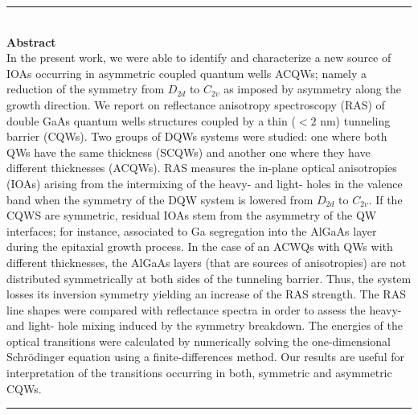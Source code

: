 \cleardoublepage
\vspace{-5cm}
\begin{vcentrepage}
	\noindent\rule[2pt]{\textwidth}{0.8pt}\\

	{\Large\textbf{Abstract}}\\

	
	In the present work, we were able to identify and characterize a new source of IOAs occurring in asymmetric coupled quantum wells ACQWs; namely a reduction of the symmetry from $D_{2d}$ to $C_{2v}$ as imposed by asymmetry along the growth direction.
	We report  on reflectance anisotropy spectroscopy (RAS) of  double GaAs quantum wells structures coupled by a thin ($<2$ nm) tunneling  barrier (CQWs). Two groups of DQWs systems were studied: one where both QWs have the same thickness (SCQWs) and another one where they have different thicknesses (ACQWs). RAS measures the in-plane optical anisotropies (IOAs) arising from the intermixing of the heavy- and light- holes in the valence band when the symmetry of the DQW system is lowered from $D_{2d}$ to $C_{2v}$. If the CQWS are symmetric, residual IOAs stem from the asymmetry of the QW  interfaces; for instance, associated to Ga segregation into the AlGaAs layer during the epitaxial growth process. In the case of an ACWQs with QWs with different thicknesses, the AlGaAs layers (that are sources of anisotropies) are not distributed symmetrically at both sides of the tunneling barrier. Thus, the system losses its inversion symmetry  yielding an increase of the RAS strength. The RAS line shapes were compared with reflectance spectra in order to assess the heavy- and light- hole mixing induced by the  symmetry breakdown. The energies of the optical transitions were calculated by numerically solving the one-dimensional Schr\"odinger equation using a finite-differences method. Our results are useful for interpretation of the transitions occurring in both, symmetric and asymmetric CQWs.
	
	\noindent\rule[2pt]{\textwidth}{0.8pt}
\end{vcentrepage}


%